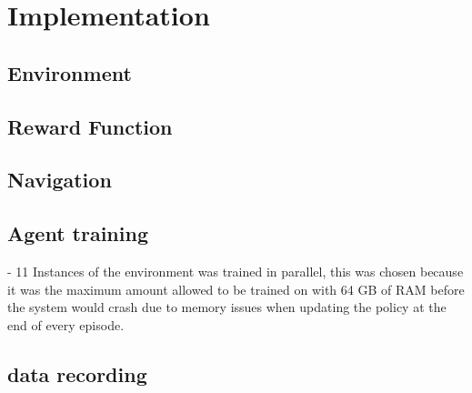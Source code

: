 \section{Implementation}

\subsection{Environment}

\subsection{Reward Function}

\subsection{Navigation}

\subsection{Agent training}

- 11 Instances of the environment was trained in parallel, this was chosen because it was the maximum amount allowed to be trained on with 64 GB of RAM before the system would crash due to memory issues when updating the policy at the end of every episode. 

\subsection{data recording}

